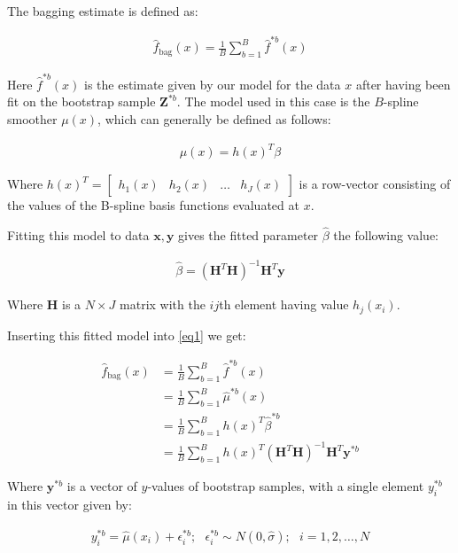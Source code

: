 \documentclass[a4paper, 12pt]{article}
\begin{document}
The bagging estimate is defined as:


\begin{align}\label{eq1}
	\hat{f}_{\text{bag}}(x) = \frac{1}{B} \sum_{b=1}^B \hat{f}^{*b}(x)
\end{align}

Here $\hat{f}^{*b}(x)$ is the estimate given by our model for the data $x$ after having been fit on the bootstrap sample $\mathbf{Z}^{*b}$. The model used in this case is the $B$-spline smoother $\mu(x)$, which can generally be defined as follows:

\begin{align}
	\mu(x) = {h(x)}^T \beta
\end{align}

Where ${h(x)}^T = \left[\begin{array}{cccc}
	h_1(x) & h_2(x) & \ldots & h_J(x)
\end{array}\right]$ is a row-vector consisting of the values of the B-spline basis functions evaluated at $x$.

Fitting this model to data $\mathbf{x}, \mathbf{y}$ gives the fitted parameter $\hat{\beta}$ the following value:

\begin{align}
	\hat{\beta} = (\mathbf{H}^T \mathbf{H})^{-1} \mathbf{H}^T \mathbf{y}
\end{align}

Where $\mathbf{H}$ is a $N \times J$ matrix with the $ij$th element having value $h_j(x_i)$.

Inserting this fitted model into \autoref{eq1} we get:

\begin{align}
	\hat{f}_{\text{bag}}(x) &= \frac{1}{B} \sum_{b=1}^B \hat{f}^{*b}(x)\\
	&= \frac{1}{B} \sum_{b=1}^B \hat{\mu}^{*b}(x)\\
	&= \frac{1}{B} \sum_{b=1}^B {h(x)}^T \hat{\beta}^{*b}\\
	&= \frac{1}{B} \sum_{b=1}^B {h(x)}^T (\mathbf{H}^T \mathbf{H})^{-1} \mathbf{H}^T \mathbf{y}^{*b}\label{eq2}
\end{align}


Where $\mathbf{y}^{*b}$ is a vector of $y$-values of bootstrap samples, with a single element $y_i^{*b}$ in this vector given by:

\begin{align}
	y_i^{*b} = \hat{\mu}(x_i) + \epsilon_i^{*b};~~~ \epsilon_i^{*b} \sim N(0, \hat{\sigma});~~~ i = 1,2,\ldots,N
\end{align}
\end{document}
